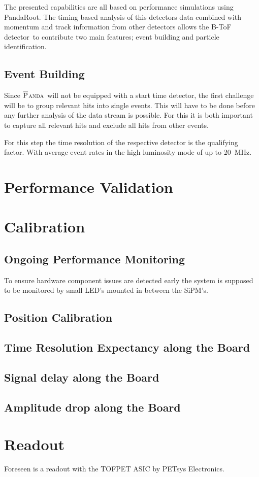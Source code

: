 \documentclass[12pt,a4paper,oneside]{article}
\newcommand{\panda}{\textsc{$\overline{\textsc{P}}$anda}}
\newcommand{\btofD}{B-ToF detector}
\newcommand{\sipms}{SiPM's}
\begin{document}
The presented capabilities are all based on performance simulations using PandaRoot. The timing based analysis of this detectors data combined with momentum and track information from other detectors allows the \btofD\ to contribute two main features; event building and particle identification.

\subsection{Event Building}

Since \panda\ will not be equipped with a start time detector, the first challenge will be to group relevant hits into single events. This will have to be done before any further analysis of the data stream is possible. For this it is both important to capture all relevant hits and exclude all hits from other events.

For this step the time resolution of the respective detector is the qualifying factor. With average event rates in the high luminosity mode of up to \SI{20}{MHz}.


\section{Performance Validation}


\section{Calibration}

\subsection{Ongoing Performance Monitoring}

To ensure hardware component issues are detected early the system is supposed to be monitored by small LED's mounted in between the \sipms .

\subsection{Position Calibration}

\subsection{Time Resolution Expectancy along the Board}

\subsection{Signal delay along the Board}

\subsection{Amplitude drop along the Board}


\section{Readout}

Foreseen is a readout with the TOFPET ASIC by PETsys Electronics.


\newpage
\listoftodos
\end{document}
